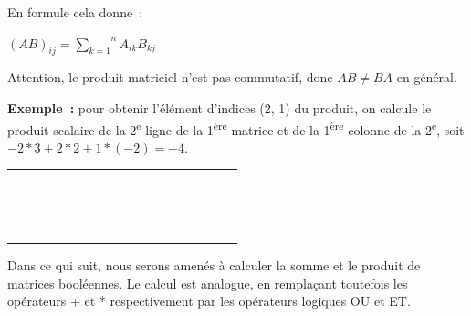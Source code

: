 			En formule cela donne~:
			
			\begin{center}
			$(AB)_{ij} = \overset n{\underset{k=1}\sum} A_{ik} B_{kj}$
			\end{center}
			
			Attention, le produit matriciel n'est pas commutatif, 
			donc $AB \neq BA$ en général.

			\textbf{Exemple~:} pour obtenir l'élément d'indices (2, 1) 
			du produit, on calcule le produit scalaire de la
			2\textsuperscript{e} ligne de la 1\textsuperscript{ère} 
			matrice et de la 1\textsuperscript{ère} colonne de la
			2\textsuperscript{e}, soit $-2*3 + 2*2 + 1*(-2) = -4$.

			\begin{center}
				\tablefirsthead{}
				\tablehead{}
				\tabletail{}
				\tablelasttail{}
				\begin{supertabular}{|m{0.601cm}|m{0.601cm}|m{0.601cm}|m{0.601cm}m{0.601cm}m{0.601cm}|m{0.601cm}|m{0.601cm}|m{0.601cm}|m{0.601cm}m{0.601cm}m{0.601cm}|m{0.601cm}|m{0.601cm}|m{0.61800003cm}|}
				\hhline{---~~~---~~~---}
				 &
				 &
				 &
				~
				 &
				~
				 &
				~
				 &
				 &
				 &
				 &
				~
				 &
				~
				 &
				~
				 &
				 &
				 &
				\centering{}\\\hhline{---~~~---~~~---}
				 &
				 &
				 &
				~
				 &
				\centering{ *} &
				~
				 &
				 &
				 &
				 &
				~
				 &
				\centering{ =} &
				~
				 &
				 &
				 &
				\centering{}\\\hhline{---~~~---~~~---}
				 &
				 &
				 &
				~
				 &
				~
				 &
				~
				 &
				 &
				 &
				 &
				~
				 &
				~
				 &
				~
				 &
				 &
				 &
				\centering{}\\\hhline{---~~~---~~~---}
				\end{supertabular}
			\end{center}

			Dans ce qui suit, nous serons amenés à calculer la somme 
			et le produit de matrices booléennes. Le calcul est analogue,
			en remplaçant toutefois les opérateurs + et * respectivement 
			par les opérateurs logiques OU et ET.


